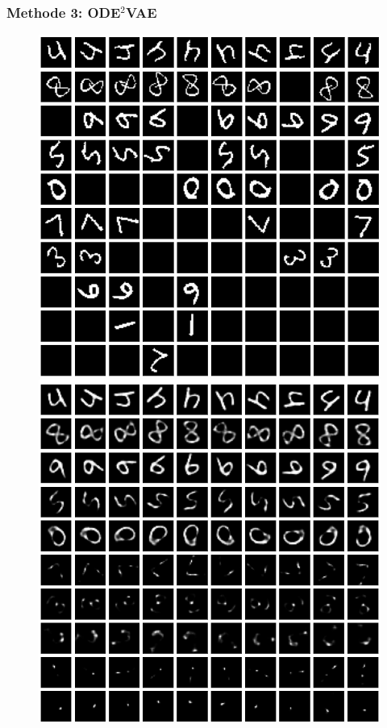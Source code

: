 \documentclass[12pt]{article}
\begin{document}
	\subsubsection{Methode 3: ODE$^2$VAE}
		\begin{figure}[h!]
		\begin{minipage}{0.5\textwidth}
			\includegraphics[scale=0.33]{rotatingMNIST_VAE}
		\end{minipage}
		\begin{minipage}{0.5\textwidth}
			\includegraphics[scale=0.33]{rotatingMNIST_VAElat}
		\end{minipage}
	\end{figure}
\end{document}
